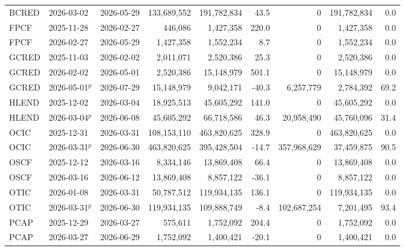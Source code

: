 \documentclass[12pt]{standalone}
\begin{document}
\begin{tabular}{lllrrrrrr}
BCRED & 2026-03-02 & 2026-05-29 & 133,689,552 & 191,782,834 & 43.5 & 0 & 191,782,834 & 0.0 \\
FPCF & 2025-11-28 & 2026-02-27 & 446,086 & 1,427,358 & 220.0 & 0 & 1,427,358 & 0.0 \\
FPCF & 2026-02-27 & 2026-05-29 & 1,427,358 & 1,552,234 & 8.7 & 0 & 1,552,234 & 0.0 \\
GCRED & 2025-11-03 & 2026-02-02 & 2,011,071 & 2,520,386 & 25.3 & 0 & 2,520,386 & 0.0 \\
GCRED & 2026-02-02 & 2026-05-01 & 2,520,386 & 15,148,979 & 501.1 & 0 & 15,148,979 & 0.0 \\
GCRED & 2026-05-01$^{p}$ & 2026-07-29 & 15,148,979 & 9,042,171 & -40.3 & 6,257,779 & 2,784,392 & 69.2 \\
HLEND & 2025-12-02 & 2026-03-04 & 18,925,513 & 45,605,292 & 141.0 & 0 & 45,605,292 & 0.0 \\
HLEND & 2026-03-04$^{p}$ & 2026-06-08 & 45,605,292 & 66,718,586 & 46.3 & 20,958,490 & 45,760,096 & 31.4 \\
OCIC & 2025-12-31 & 2026-03-31 & 108,153,110 & 463,820,625 & 328.9 & 0 & 463,820,625 & 0.0 \\
OCIC & 2026-03-31$^{p}$ & 2026-06-30 & 463,820,625 & 395,428,504 & -14.7 & 357,968,629 & 37,459,875 & 90.5 \\
OSCF & 2025-12-12 & 2026-03-16 & 8,334,146 & 13,869,408 & 66.4 & 0 & 13,869,408 & 0.0 \\
OSCF & 2026-03-16 & 2026-06-12 & 13,869,408 & 8,857,122 & -36.1 & 0 & 8,857,122 & 0.0 \\
OTIC & 2026-01-08 & 2026-03-31 & 50,787,512 & 119,934,135 & 136.1 & 0 & 119,934,135 & 0.0 \\
OTIC & 2026-03-31$^{p}$ & 2026-06-30 & 119,934,135 & 109,888,749 & -8.4 & 102,687,254 & 7,201,495 & 93.4 \\
PCAP & 2025-12-29 & 2026-03-27 & 575,611 & 1,752,092 & 204.4 & 0 & 1,752,092 & 0.0 \\
PCAP & 2026-03-27 & 2026-06-29 & 1,752,092 & 1,400,421 & -20.1 & 0 & 1,400,421 & 0.0 \\
\bottomrule\end{tabular}
\end{document}
